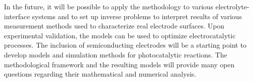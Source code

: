 \documentclass[a4paper,10pt]{article}
\begin{document}
In the future, it will be possible to apply the methodology to various electrolyte-interface systems
and to set up inverse problems to interpret results of various measurement methods used to characterize real electrode surfaces. Upon experimental validation, the models can be used to optimize electrocatalytic processes.
The inclusion of semiconducting electrodes will be a starting point to develop models and simulation methods
for photocatalytic reactions.
The methodological framework and the resulting models will provide many open questions regarding their
mathematical and numerical analysis.


%
%
\end{document}
